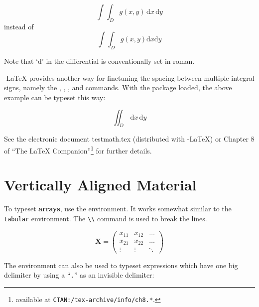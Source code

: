 \begin{example}
\newcommand{\ud}{\mathrm{d}}
\begin{displaymath}
\int\!\!\!\int_{D} g(x,y)
  \, \ud x\, \ud y 
\end{displaymath}
instead of 
\begin{displaymath}
\int\int_{D} g(x,y)\ud x \ud y
\end{displaymath}
\end{example}
Note that `d' in the differential is conventionally set in roman.

\AmS-\LaTeX{} provides another way for finetuning
the spacing between multiple integral signs,
namely the , , , and  commands.
With the  package loaded, the above example can be
typeset this way:

\begin{example}
\newcommand{\ud}{\mathrm{d}}
\begin{displaymath}
\iint_{D} \, \ud x \, \ud y
\end{displaymath}
\end{example}

See the electronic document testmath.tex (distributed with
\AmS-\LaTeX) or Chapter 8 of ``The LaTeX Companion''\footnote{
available at \texttt{CTAN:/tex-archive/info/ch8.*}.} for further details.

\section{Vertically Aligned Material}
\label{sec:vert}

To typeset \textbf{arrays}, use the  environment. It works
somewhat similar to the \texttt{tabular} environment. The \verb|\\| command is
used to break the lines.

\begin{example}
\begin{displaymath}
\mathbf{X} =
\left( \begin{array}{ccc}
x_{11} & x_{12} & \ldots \\
x_{21} & x_{22} & \ldots \\
\vdots & \vdots & \ddots
\end{array} \right)
\end{displaymath}
\end{example}

The  environment can also be used to typeset expressions which have one
big delimiter by using a ``\verb|.|'' as an invisible  
delimiter:

